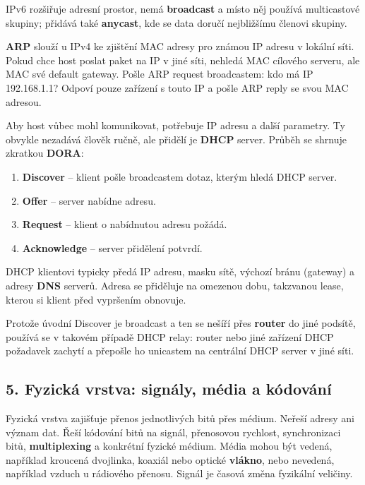 
IPv6 rozšiřuje adresní prostor, nemá \textbf{broadcast} a místo něj používá multicastové skupiny; přidává také \textbf{anycast}, kde se data doručí nejbližšímu členovi skupiny.

\textbf{ARP} slouží u IPv4 ke zjištění MAC adresy pro známou IP adresu v lokální síti. Pokud chce host poslat paket na IP v jiné síti, nehledá MAC cílového serveru, ale MAC své default gateway. Pošle ARP request broadcastem: kdo má IP 192.168.1.1? Odpoví pouze zařízení s touto IP a pošle ARP reply se svou MAC adresou.

Aby host vůbec mohl komunikovat, potřebuje IP adresu a další parametry. Ty obvykle nezadává člověk ručně, ale přidělí je \textbf{DHCP} server. Průběh se shrnuje zkratkou \textbf{DORA}:
\begin{enumerate}
  \item \textbf{Discover} -- klient pošle broadcastem dotaz, kterým hledá DHCP server.
  \item \textbf{Offer} -- server nabídne adresu.
  \item \textbf{Request} -- klient o nabídnutou adresu požádá.
  \item \textbf{Acknowledge} -- server přidělení potvrdí.
\end{enumerate}

DHCP klientovi typicky předá IP adresu, masku sítě, výchozí bránu (gateway) a adresy \textbf{DNS} serverů. Adresa se přiděluje na omezenou dobu, takzvanou lease, kterou si klient před vypršením obnovuje.

Protože úvodní Discover je broadcast a ten se nešíří přes \textbf{router} do jiné podsítě, používá se v takovém případě DHCP relay: router nebo jiné zařízení DHCP požadavek zachytí a přepošle ho unicastem na centrální DHCP server v jiné síti.

\subsection*{5. Fyzická vrstva: signály, média a kódování}

Fyzická vrstva zajišťuje přenos jednotlivých bitů přes médium. Neřeší adresy ani význam dat. Řeší kódování bitů na signál, přenosovou rychlost, synchronizaci bitů, \textbf{multiplexing} a konkrétní fyzické médium. Média mohou být vedená, například kroucená dvojlinka, koaxiál nebo optické \textbf{vlákno}, nebo nevedená, například vzduch u rádiového přenosu. Signál je časová změna fyzikální veličiny.

